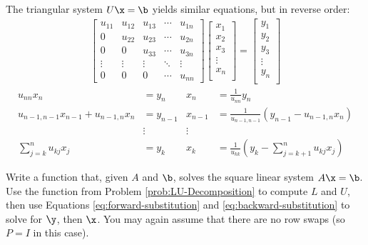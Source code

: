 The triangular system $U\x = \b$ yields similar equations, but in reverse order:
%
\begin{align*}
\left[\begin{array}{ccccc}
u_{11} & u_{12} & u_{13} & \cdots & u_{1n} \\
0      & u_{22} & u_{23} & \cdots & u_{2n} \\
0      & 0      & u_{33} & \cdots & u_{3n} \\
\vdots & \vdots & \vdots & \ddots & \vdots \\
0      & 0      & 0      & \cdots & u_{nn}
\end{array}\right]
\left[\begin{array}{c}
x_1 \\ x_2 \\ x_3 \\ \vdots \\ x_n \\
\end{array}\right]
=
\left[\begin{array}{c}
y_1 \\ y_2 \\ y_3 \\ \vdots \\ y_n \\
\end{array}\right]
\end{align*}
%
\begin{align}
\nonumber u_{nn}x_n &= y_n & x_n &= \frac{1}{u_{nn}}y_n \\
\nonumber u_{n-1,n-1}x_{n-1} + u_{n-1,n}x_{n} &= y_{n-1} & x_{n-1} &= \frac{1}{u_{n-1,n-1}}\left(y_{n-1} - u_{n-1,n}x_{n}\right)\\
\nonumber & \vdots & \vdots & \\
\sum_{j=k}^{n}u_{kj}x_j &= y_k & x_k &= \frac{1}{u_{kk}}\left(y_k - \sum_{j=k+1}^{n}u_{kj}x_j\right)
\label{eq:backward-substitution}
\end{align}

\begin{problem} %
Write a function that, given $A$ and $\b$, solves the square linear system $A\x = \b$.
Use the function from Problem \ref{prob:LU-Decomposition} to compute $L$ and $U$, then use Equations \ref{eq:forward-substitution} and \ref{eq:backward-substitution} to solve for $\y$, then $\x$.
You may again assume that there are no row swaps (so $P = I$ in this case).
\end{problem}

